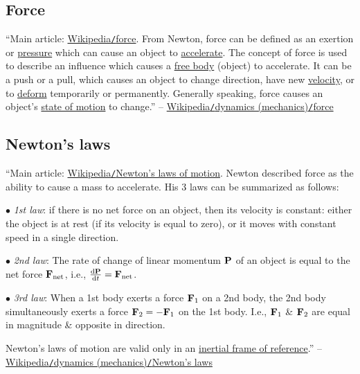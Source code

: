\documentclass{article}
\numberwithin{equation}{section}
\begin{document}
\subsection{Force}
``Main article: \href{https://en.wikipedia.org/wiki/Force}{Wikipedia\texttt{/}force}. From Newton, force can be defined as an exertion or \href{https://en.wikipedia.org/wiki/Pressure}{pressure} which can cause an object to \href{https://en.wikipedia.org/wiki/Accelerate}{accelerate}. The concept of force is used to describe an influence which causes a \href{https://en.wikipedia.org/wiki/Free_body}{free body} (object) to accelerate. It can be a push or a pull, which causes an object to change direction, have new \href{https://en.wikipedia.org/wiki/Velocity}{velocity}, or to \href{https://en.wikipedia.org/wiki/Deformation_(mechanics)}{deform} temporarily or permanently. Generally speaking, force causes an object's \href{https://en.wikipedia.org/wiki/Motion_(physics)}{state of motion} to change.'' -- \href{https://en.wikipedia.org/wiki/Dynamics_(mechanics)#Force}{Wikipedia\texttt{/}dynamics (mechanics)\texttt{/}force}

\subsection{Newton's laws}
``Main article: \href{https://en.wikipedia.org/wiki/Newton%27s_laws_of_motion}{Wikipedia\texttt{/}Newton's laws of motion}. Newton described force as the ability to cause a mass to accelerate. His 3 laws can be summarized as follows:
\begin{enumerate*}
	\item[$\bullet$] \textit{1st law}: if there is no net force on an object, then its velocity is constant: either the object is at rest (if its velocity is equal to zero), or it moves with constant speed in a single direction.
	\item[$\bullet$] \textit{2nd law}: The rate of change of linear momentum ${\bf P}$ of an object is equal to the net force ${\bf F}_{\rm net}$, i.e., $\frac{{\rm d}{\bf P}}{{\rm d}t} = {\bf F}_{\rm net}$.
	\item[$\bullet$] \textit{3rd law}: When a 1st body exerts a force ${\bf F}_1$ on a 2nd body, the 2nd body simultaneously exerts a force ${\bf F}_2 = -{\bf F}_1$ on the 1st body. I.e., ${\bf F}_1$ \& ${\bf F}_2$ are equal in magnitude \& opposite in direction.
\end{enumerate*}
Newton's laws of motion are valid only in an \href{https://en.wikipedia.org/wiki/Inertial_frame_of_reference}{inertial frame of reference}.'' -- \href{https://en.wikipedia.org/wiki/Dynamics_(mechanics)#Newton's_laws}{Wikipedia\texttt{/}dynamics (mechanics)\texttt{/}Newton's laws}
\end{document}
